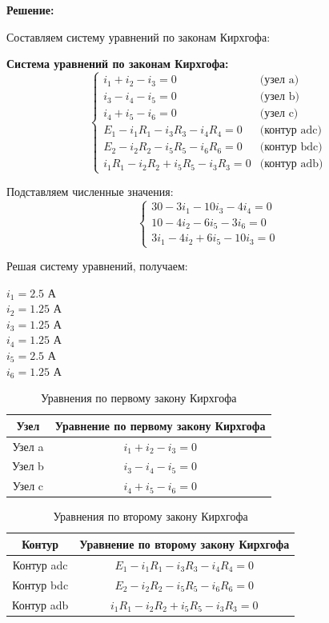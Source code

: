 \textbf{Решение:}

Составляем систему уравнений по законам Кирхгофа:

\textbf{Система уравнений по законам Кирхгофа:}
$$\begin{cases}
i_1 + i_2 - i_3 = 0 & \text{(узел a)} \\
i_3 - i_4 - i_5 = 0 & \text{(узел b)} \\
i_4 + i_5 - i_6 = 0 & \text{(узел c)} \\
E_1 - i_1R_1 - i_3R_3 - i_4R_4 = 0 & \text{(контур adc)} \\
E_2 - i_2R_2 - i_5R_5 - i_6R_6 = 0 & \text{(контур bdc)} \\
i_1R_1 - i_2R_2 + i_5R_5 - i_3R_3 = 0 & \text{(контур adb)}
\end{cases}$$

Подставляем численные значения:
$$\begin{cases}
30 - 3i_1 - 10i_3 - 4i_4 = 0 \\
10 - 4i_2 - 6i_5 - 3i_6 = 0 \\
3i_1 - 4i_2 + 6i_5 - 10i_3 = 0
\end{cases}$$

Решая систему уравнений, получаем:
\begin{flushleft}
$i_1 = 2.5$ А \\
$i_2 = 1.25$ А \\
$i_3 = 1.25$ А \\
$i_4 = 1.25$ А \\
$i_5 = 2.5$ А \\
$i_6 = 1.25$ А
\end{flushleft}

\begin{table}[H]
\centering
\begin{tabular}{|c|c|}
\hline
\textbf{Узел} & \textbf{Уравнение по первому закону Кирхгофа} \\
\hline
Узел a & $i_1 + i_2 - i_3 = 0$ \\
\hline
Узел b & $i_3 - i_4 - i_5 = 0$ \\
\hline
Узел c & $i_4 + i_5 - i_6 = 0$ \\
\hline
\end{tabular}
\caption{Уравнения по первому закону Кирхгофа}
\label{tab:kirchhoff_first_law}
\end{table}

\begin{table}[H]
\centering
\begin{tabular}{|c|c|}
\hline
\textbf{Контур} & \textbf{Уравнение по второму закону Кирхгофа} \\
\hline
Контур adc & $E_1 - i_1R_1 - i_3R_3 - i_4R_4 = 0$ \\
\hline
Контур bdc & $E_2 - i_2R_2 - i_5R_5 - i_6R_6 = 0$ \\
\hline
Контур adb & $i_1R_1 - i_2R_2 + i_5R_5 - i_3R_3 = 0$ \\
\hline
\end{tabular}
\caption{Уравнения по второму закону Кирхгофа}
\label{tab:kirchhoff_second_law}
\end{table}



